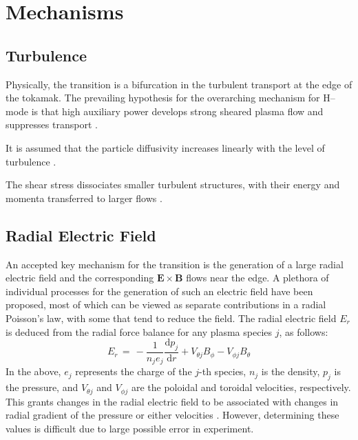 \section{Mechanisms}\label{sec:mechanics}
\subsection{Turbulence}\label{ssec:turbulence}
Physically, the transition is a bifurcation in the turbulent transport at the edge of the tokamak.
The prevailing hypothesis for the overarching mechanism for H--mode is that high auxiliary power develops strong sheared plasma flow and suppresses transport \cite{freidberg_plasma_2007}.

It is assumed that the particle diffusivity increases linearly with the level of turbulence \cite{diamond_dynamics_1995}.

The shear stress dissociates smaller turbulent structures, with their energy and momenta transferred to larger flows \cite{staps_backstepping_2017}.

\subsection{Radial Electric Field}\label{ssec:E_r}
An accepted key mechanism for the transition is the generation of a large radial electric field and the corresponding $\mathbf{E}\times\mathbf{B}$ flows near the edge.
A plethora of individual processes for the generation of such an electric field have been proposed, most of which can be viewed as separate contributions in a radial Poisson's law, with some that tend to reduce the field.
The radial electric field $E_r$ is deduced from the radial force balance for any plasma species $j$, as follows:
\begin{equation}
	E_r \,=\, -\frac{1}{n_j e_j} \frac{\text{d} p_j}{\text{d} r} + V_{\theta j} B_\phi - V_{\phi j} B_\theta
	\label{eq:E_r}
\end{equation}
In the above, $e_j$ represents the charge of the $j$-th species, $n_j$ is the density, $p_j$ is the pressure, and $V_{\theta j}$ and $V_{\phi j}$ are the poloidal and toroidal velocities, respectively.
This grants changes in the radial electric field to be associated with changes in radial gradient of the pressure or either velocities \cite{connor_review_2000}\cite{staps_backstepping_2017}.
However, determining these values is difficult due to large possible error in experiment.

